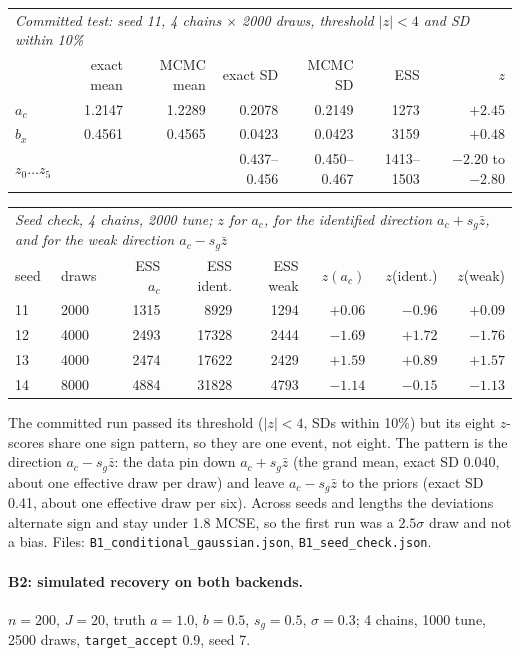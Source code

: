 \documentclass[11pt]{article}
\newcommand{\code}[1]{\texttt{#1}}
\newcommand{\file}[1]{\texttt{#1}}
\begin{document}
\begin{center}\footnotesize
\begin{tabular}{lrrrrrr}
\toprule
\multicolumn{7}{l}{\emph{Committed test: seed 11, 4 chains $\times$ 2000 draws, threshold $|z|<4$ and SD within 10\%}} \\
 & exact mean & MCMC mean & exact SD & MCMC SD & ESS & $z$ \\
\midrule
$a_c$ & 1.2147 & 1.2289 & 0.2078 & 0.2149 & 1273 & $+2.45$ \\
$b_x$ & 0.4561 & 0.4565 & 0.0423 & 0.0423 & 3159 & $+0.48$ \\
$z_0 \dots z_5$ & & & 0.437--0.456 & 0.450--0.467 & 1413--1503 & $-2.20$ to $-2.80$ \\
\bottomrule
\end{tabular}

\medskip
\begin{tabular}{llrrrrrr}
\toprule
\multicolumn{8}{l}{\emph{Seed check, 4 chains, 2000 tune; $z$ for $a_c$, for the identified direction $a_c + s_g\bar z$, and for the weak direction $a_c - s_g\bar z$}} \\
seed & draws & ESS $a_c$ & ESS ident. & ESS weak & $z(a_c)$ & $z$(ident.) & $z$(weak) \\
\midrule
11 & 2000 & 1315 & 8929 & 1294 & $+0.06$ & $-0.96$ & $+0.09$ \\
12 & 4000 & 2493 & 17328 & 2444 & $-1.69$ & $+1.72$ & $-1.76$ \\
13 & 4000 & 2474 & 17622 & 2429 & $+1.59$ & $+0.89$ & $+1.57$ \\
14 & 8000 & 4884 & 31828 & 4793 & $-1.14$ & $-0.15$ & $-1.13$ \\
\bottomrule
\end{tabular}
\end{center}

The committed run passed its threshold ($|z| < 4$, SDs within 10\%) but its eight
$z$-scores share one sign pattern, so they are one event, not eight. The pattern is the
direction $a_c - s_g \bar z$: the data pin down $a_c + s_g \bar z$ (the grand mean, exact
SD 0.040, about one effective draw per draw) and leave $a_c - s_g \bar z$ to the priors
(exact SD 0.41, about one effective draw per six). Across seeds and lengths the deviations
alternate sign and stay under 1.8 MCSE, so the first run was a $2.5\sigma$ draw and not a
bias. Files: \file{B1\_conditional\_gaussian.json}, \file{B1\_seed\_check.json}.

\paragraph{B2: simulated recovery on both backends.} $n = 200$, $J = 20$, truth
$a = 1.0$, $b = 0.5$, $s_g = 0.5$, $\sigma = 0.3$; 4 chains, 1000 tune, 2500 draws,
\code{target\_accept} 0.9, seed 7.
\end{document}

